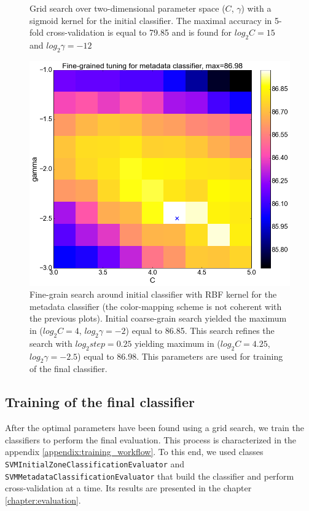 \begin{center}
\begin{figure}
  \caption{Grid search over two-dimensional parameter space ($C$, $\gamma$) with a sigmoid kernel for the initial classifier. The maximal accuracy in 5-fold cross-validation is equal to 79.85 and is found for $log_{2}C=15$ and $log_{2}\gamma=-12$}
  \label{fig:meta_sigmoid}
\end{figure}
\begin{figure}
	\centering
  \includegraphics[width=\textwidth]{plots/meta_fine}
  \caption{Fine-grain search around initial classifier with RBF kernel for the metadata classifier (the color-mapping scheme is not coherent with the previous plots). Initial coarse-grain search yielded the maximum in ($log_{2}C=4$, $log_{2}\gamma=-2$) equal to 86.85. This search refines the search with $log_{2}step=0.25$ yielding maximum in ($log_{2}C=4.25$, $log_{2}\gamma=-2.5$) equal to 86.98. This parameters are used for training of the final classifier.}
  \label{fig:meta_fine}
\end{figure}
\end{center}

\subsection{Training of the final classifier}
After the optimal parameters have been found using a grid search, we train the classifiers to perform the final evaluation. This process is characterized in the appendix \ref{appendix:training_workflow}. To this end, we used classes \verb+SVMInitialZoneClassificationEvaluator+ and \verb+SVMMetadataClassificationEvaluator+ that build the classifier and perform cross-validation at a time. Its results are presented in the chapter \ref{chapter:evaluation}.

